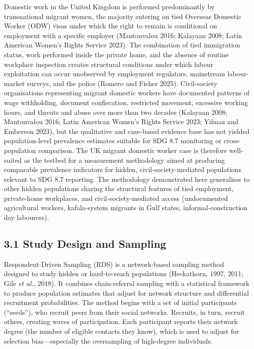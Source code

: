 \documentclass[
  12pt,
  letterpaper,
  DIV=11,
  numbers=noendperiod]{scrartcl}
\begin{document}
Domestic work in the United Kingdom is performed predominantly by
transnational migrant women, the majority entering on tied Overseas
Domestic Worker (ODW) visas under which the right to remain is
conditional on employment with a specific employer (Mantouvalou 2016;
Kalayaan 2008; Latin American Women's Rights Service 2023). The
combination of tied immigration status, work performed inside the
private home, and the absence of routine workplace inspection creates
structural conditions under which labour exploitation can occur
unobserved by employment regulators, mainstream labour-market surveys,
and the police (Romero and Fisher 2025). Civil-society organisations
representing migrant domestic workers have documented patterns of wage
withholding, document confiscation, restricted movement, excessive
working hours, and threats and abuse over more than two decades
(Kalayaan 2008; Mantouvalou 2016; Latin American Women's Rights Service
2023; Yilmaz and Emberson 2023), but the qualitative and case-based
evidence base has not yielded population-level prevalence estimates
suitable for SDG 8.7 monitoring or cross-population comparison. The UK
migrant domestic worker case is therefore well-suited as the testbed for
a measurement methodology aimed at producing comparable prevalence
indicators for hidden, civil-society-mediated populations relevant to
SDG 8.7 reporting. The methodology demonstrated here generalises to
other hidden populations sharing the structural features of tied
employment, private-home workplaces, and civil-society-mediated access
(undocumented agricultural workers, kafala-system migrants in Gulf
states, informal-construction day labourers).

\subsection{3.1 Study Design and
Sampling}\label{study-design-and-sampling}

Respondent-Driven Sampling (RDS) is a network-based sampling method
designed to study hidden or hard-to-reach populations (Heckathorn, 1997,
2011; Gile \emph{et al.}, 2018). It combines chain-referral sampling
with a statistical framework to produce population estimates that adjust
for network structure and differential recruitment probabilities. The
method begins with a set of initial participants (``seeds''), who
recruit peers from their social networks. Recruits, in turn, recruit
others, creating waves of participation. Each participant reports their
network degree (the number of eligible contacts they know), which is
used to adjust for selection bias---especially the oversampling of
high-degree individuals.
\end{document}
